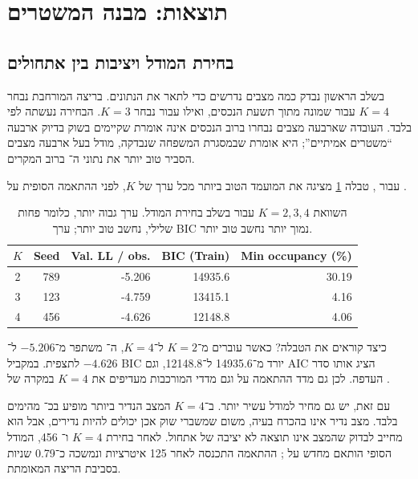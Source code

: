 \section{תוצאות: מבנה המשטרים}

\subsection{בחירת המודל ויציבות בין אתחולים}

בשלב הראשון נבדק כמה מצבים נדרשים כדי לתאר את הנתונים. בריצה המורחבת נבחר \(K=4\) עבור שמונה מתוך תשעת הנכסים, ואילו עבור  נבחר \(K=3\). הבחירה נעשתה לפי  בלבד. העובדה שארבעה מצבים נבחרו ברוב הנכסים אינה אומרת שקיימים בשוק בדיוק ארבעה ``משטרים אמיתיים''; היא אומרת שבמסגרת המשפחה שנבדקה, מודל בעל ארבעה מצבים הסביר טוב יותר את נתוני ה־ ברוב המקרים.

עבור , טבלה \ref{tab:spykcomparison} מציגה את המועמד הטוב ביותר מכל ערך של \(K\), לפני ההתאמה הסופית על .

\begin{table}[H]
\centering
\small
\begin{english}
\begin{tabular}{c r r r r}
\toprule
\(K\) & Seed & Val. LL / obs. & BIC (Train) & Min occupancy (\%) \\
\midrule
2 & 789 & -5.206 & 14935.6 & 30.19 \\
3 & 123 & -4.759 & 13415.1 & 4.16 \\
4 & 456 & -4.626 & 12148.8 & 4.06 \\
\bottomrule
\end{tabular}
\end{english}
\caption{השוואת \(K=2,3,4\) עבור  בשלב בחירת המודל. ערך  גבוה יותר, כלומר פחות שלילי, נחשב טוב יותר; ערך BIC נמוך יותר נחשב טוב יותר.}
\label{tab:spykcomparison}
\end{table}

כיצד קוראים את הטבלה? כאשר עוברים מ־\(K=2\) ל־\(K=4\), ה־ משתפר מ־\(-5.206\) ל־\(-4.626\) לתצפית. במקביל BIC יורד מ־14935.6 ל־12148.8, וגם AIC הציג אותו סדר העדפה. לכן גם מדד ההתאמה על  וגם מדדי המורכבות מעדיפים את \(K=4\) במקרה של .

עם זאת, יש גם מחיר למודל עשיר יותר. ב־\(K=4\) המצב הנדיר ביותר מופיע בכ־ מהימים בלבד. מצב נדיר אינו בהכרח בעיה, משום שמשברי שוק אכן יכולים להיות נדירים, אבל הוא מחייב לבדוק שהמצב אינו תוצאה לא יציבה של אתחול. לאחר בחירת \(K=4\) ו־ 456, המודל הסופי הותאם מחדש על ; ההתאמה התכנסה לאחר 125 איטרציות ונמשכה כ־0.79 שניות בסביבת הריצה המאומתת.

